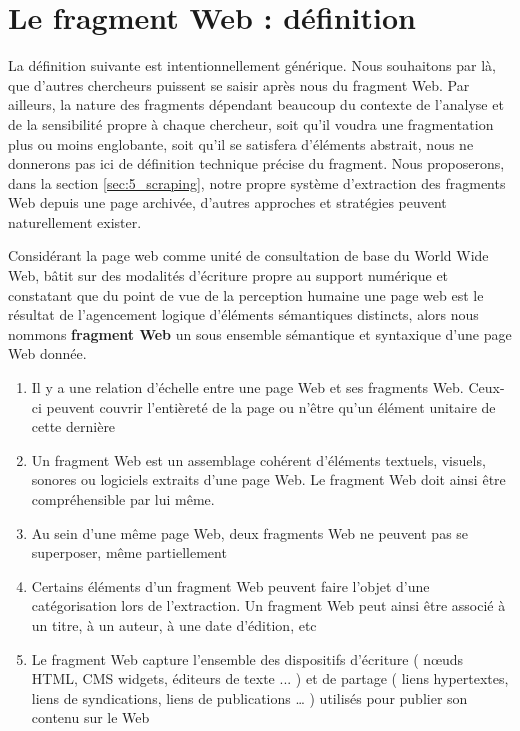 \documentclass[symmetric,justified,marginals=raggedouter]{tufte-book}
\begin{document}
\section{Le fragment Web : définition}
\label{sec:5_fragment}

\noindent La définition suivante est intentionnellement générique. Nous souhai\-tons par là, que d'autres chercheurs puissent se saisir après nous du fragment Web. Par ailleurs, la nature des fragments dépendant beaucoup du contexte de l'analyse et de la sensibilité propre à chaque chercheur, soit qu'il voudra une fragmentation plus ou moins englobante, soit qu'il se satisfera d'éléments abstrait, nous ne donnerons pas ici de définition technique précise du fragment. Nous proposerons, dans la section \ref{sec:5_scraping}, notre propre système d'extraction des fragments Web depuis une page archivée, d'autres approches et stratégies peuvent naturellement exister.\\

\begin{itshape}
\noindent Considérant la page web comme unité de consultation de base du World Wide Web, bâtit sur des modalités d'écriture propre au support numérique et constatant que du point de vue de la perception humaine \citep{bernard_criteria_2003, michailidou_visual_2008} une page web est le résultat de l'agencement logique d'éléments sémantiques distincts, alors nous nommons \textbf{fragment Web} un sous ensemble sémantique et syntaxique d'une page Web donnée.

\begin{enumerate}[leftmargin=*]  
\item Il y a une relation d'échelle entre une page Web et ses fragments Web. Ceux-ci peuvent couvrir l'entièreté de la page ou n'être qu'un élément unitaire de cette dernière
\item Un fragment Web est un assemblage cohérent d'éléments textuels, visuels, sonores ou logiciels extraits d'une page Web. Le fragment Web doit ainsi être compréhensible par lui même.
\item Au sein d'une même page Web, deux fragments Web ne peuvent pas se superposer, même partiellement
\item Certains éléments d'un fragment Web peuvent faire l'objet d'une catégorisation lors de l'extraction. Un fragment Web peut ainsi être associé à un titre, à un auteur, à une date d'édition, etc
\item Le fragment Web capture l'ensemble des dispositifs d'écriture ( nœuds HTML, CMS widgets, éditeurs de texte ... ) et de partage ( liens hypertextes, liens de syndications, liens de publications … ) utilisés pour publier son contenu sur le Web
\end{enumerate}
\end{itshape}
\end{document}

